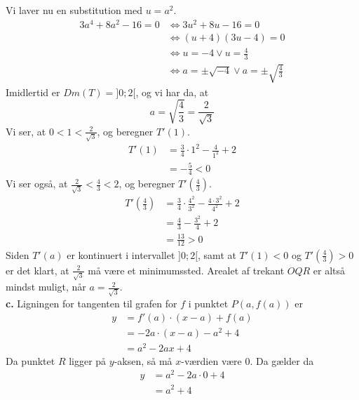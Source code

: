 \documentclass{article}
\begin{document}
Vi laver nu en substitution med $u=a^2$.
\begin{equation*}
\begin{split}
  3a^4+8a^2-16=0 &\iff 3u^2+8u-16=0\\
  &\iff \left(u+4\right) \left(3u-4\right) =0\\ 
  &\iff u=-4 \lor u=\frac{4}{3}\\ 
  &\iff a=\pm \sqrt{-4} \lor a=\pm \sqrt{\frac{4}{3}} 
\end{split}
\end{equation*}
Imidlertid er $Dm(T)=]0;2[$, og vi har da, at 
\[
a=\sqrt{\frac{4}{3}} =\frac{2}{\sqrt{3}}
\] 
Vi ser, at $0<1<\frac{2}{\sqrt{3} }$, og beregner $T'(1)$.
\begin{equation*}
\begin{split}
  T'(1)&=\frac{3}{4}\cdot 1^2-\frac{4}{1^2}+2\\ 
  &=-\frac{5}{4}<0
\end{split}
\end{equation*}
Vi ser også, at $\frac{2}{\sqrt{3} }<\frac{4}{3}<2$, og beregner $T'\left(\frac{4}{3}\right) $.
\begin{equation*}
\begin{split}
  T'\left(\frac{4}{3}\right) &=\frac{3}{4}\cdot \frac{4^2}{3^2}-\frac{4 \cdot 3^2}{4^2}+2\\
  &=\frac{4}{3}-\frac{3^2}{4}+2\\ 
  &=\frac{13}{12}>0
\end{split}
\end{equation*}
Siden $T'(a)$ er kontinuert i intervallet $]0;2[$, samt at $T'(1)<0$ og $T'\left(\frac{4}{3}\right)>0$ er det klart, at $\frac{2}{\sqrt{3} }$ må være et minimumssted. 
Arealet af trekant $OQR$ er altså mindst muligt, når $a=\frac{2}{\sqrt{3} }$. \\[1ex]
\textbf{c.}
Ligningen for tangenten til grafen for $f$ i punktet $P(a,f(a))$ er
\begin{equation*}
\begin{split}
  y&=f'(a) \cdot \left(x-a\right) +f(a)\\
  &=-2a \cdot (x-a) - a^2+4\\
  &=a^2-2ax+4
\end{split}
\end{equation*}
Da punktet $R$ ligger på $y$-aksen, så må $x$-værdien være 0. 
Da gælder da
\begin{equation*}
\begin{split}
  y&=a^2-2a \cdot 0 +4\\
  &=a^2+4
\end{split}
\end{equation*}
\end{document}
